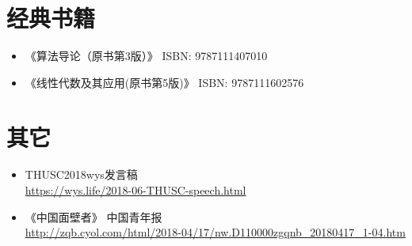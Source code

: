 \section{经典书籍}
\begin{itemize}
    \item 《算法导论（原书第3版）》 ISBN: 9787111407010
    \item 《线性代数及其应用(原书第5版)》 ISBN: 9787111602576
\end{itemize}
\section{其它}
\begin{itemize}
    \item THUSC2018wys发言稿 \\\url{https://wys.life/2018-06-THUSC-speech.html}
    \item 《中国面壁者》 中国青年报\\
    {\footnotesize \url{http://zqb.cyol.com/html/2018-04/17/nw.D110000zgqnb\_20180417\_1-04.htm}}
\end{itemize}

